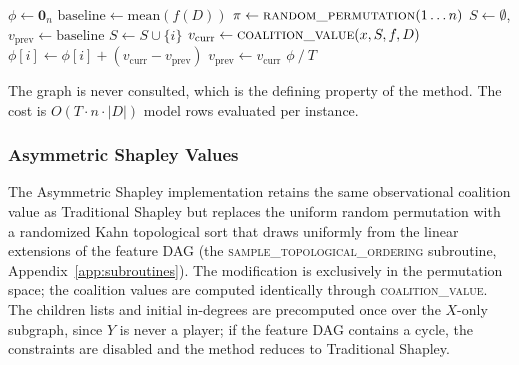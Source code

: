 \documentclass[12pt,a4paper,oneside]{article}
\begin{document}
\begin{algorithm}[H]
  \caption{Traditional Shapley (Monte Carlo)}
  \label{alg:traditional}
  \begin{algorithmic}[1]
    \State $\phi \gets \mathbf{0}_n$
    \State $\text{baseline} \gets \text{mean}(f(D))$  
      \State $\pi \gets \textsc{random\_permutation}(1 \ldots n)$  
      \State $S \gets \emptyset$,\quad $v_{\text{prev}} \gets \text{baseline}$
        
        \State $S \gets S \cup \{i\}$
        \State $v_{\text{curr}} \gets \textsc{coalition\_value}(x, S, f, D)$
        \State $\phi[i] \gets \phi[i] + (v_{\text{curr}} - v_{\text{prev}})$
        \State $v_{\text{prev}} \gets v_{\text{curr}}$
      \EndFor
    \EndFor
    \Return $\phi \mathbin{/} T$
  \end{algorithmic}
\end{algorithm}

The graph is never consulted, which is the defining property of the method. The cost is $O(T \cdot n \cdot |D|)$ model rows evaluated per instance.

\subsubsection{Asymmetric Shapley Values}

The Asymmetric Shapley implementation retains the same observational coalition value as Traditional Shapley but replaces the uniform random permutation with a randomized Kahn topological sort that draws uniformly from the linear extensions of the feature DAG (the \textsc{sample\_topological\_ordering} subroutine, Appendix~\ref{app:subroutines}). The modification is exclusively in the permutation space; the coalition values are computed identically through \textsc{coalition\_value}. The children lists and initial in-degrees are precomputed once over the $X$-only subgraph, since $Y$ is never a player; if the feature DAG contains a cycle, the constraints are disabled and the method reduces to Traditional Shapley.
\end{document}
